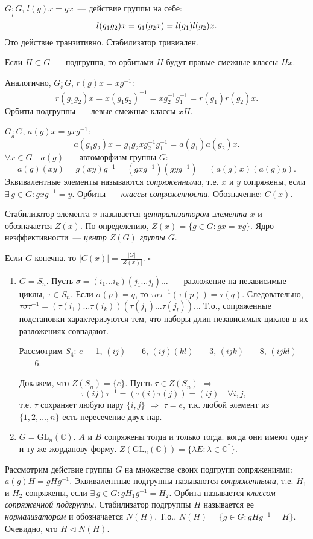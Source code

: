 \documentclass[a4paper]{article}
\newcommand*{\p}[1]{#1\nobreak\discretionary{}{\hbox{$\mathsurround=0pt #1$}}{}}
\begin{document}
$G\mathop{:}\limits_l G$, $l(g)x=gx$~--- действие группы на себе:
$$l(g_1g_2)x=g_1(g_2x)\p=l(g_1)l(g_2)x.$$ Это действие транзитивно.
Стабилизатор тривиален.

Если $H\subset G$~--- подгруппа, то орбитами $H$ будут правые
смежные классы $Hx$.

Аналогично, $G\mathop{:}\limits_r G$, $r(g)x=xg^{-1}$:
$$r(g_1g_2)x=x(g_1g_2)^{-1}=xg_2^{-1}g_1^{-1}=r(g_1)r(g_2)x.$$ Орбиты
подгруппы~--- левые смежные классы $xH$.

$G\mathop{:}\limits_a G$, $a(g)x=gxg^{-1}$:
$$a(g_1g_2)x=g_1g_2xg_2^{-1}g_1^{-1}=a(g_1)a(g_2)x.$$ $\forall x\in G
\quad a(g)$~--- автоморфизм группы $G$:
$$a(g)(xy)=g(xy)g^{-1}=(gxg^{-1})(gyg^{-1})=(a(g)x)(a(g)y).$$
Эквивалентные элементы называются \emph{сопряженными}, т.е. $x$ и
$y$ сопряжены, если $\exists \, g\in G: gxg^{-1}=y$. Орбиты~---
\emph{классы сопряженности}. Обозначение: $C(x)$.

Стабилизатор элемента $x$ называется \emph{централизатором элемента
$x$} и обозначается $Z(x)$. По определению, $Z(x)=\{g\in G:
gx=xg\}$. Ядро неэффективности~--- \emph{центр $Z(G)$ группы $G$}.

\begin{imp}
Если $G$ конечна. то $|C(x)|=\frac{|G|}{|Z(x)|}$. $\square$
\end{imp}

\begin{ex}
\begin{enumerate}
  \item $G=S_n$. Пусть $\sigma=(i_1\ldots
  i_k)(j_1\ldots j_l)\ldots$~--- разложение на независимые циклы, $\tau\in
  S_n$. Если $\sigma(p)=q$, то $\tau\sigma\tau^{-1}(\tau
  (p))=\tau(q)$. Следовательно, $\tau\sigma\tau^{-1}=(\tau(i_1)\ldots\tau(i_k))
  (\tau(j_1)\ldots\tau(j_l))\ldots$ Т.о., сопряженные подстановки
  характеризуются тем, что наборы длин независимых циклов в их
  разложениях совпадают.

  Рассмотрим $S_4$: $e$~---1, $(ij)$~--- 6, $(ij)(kl)$~--- 3,
  $(ijk)$~--- 8, $(ijkl)$~--- 6.

  Докажем, что $Z(S_n)=\{e\}$. Пусть $\tau\in Z(S_n)$ $\Rightarrow$
  $$\tau(ij)\tau^{-1}=(\tau(i)\tau(j))=(ij)\quad \forall i,j,$$ т.е.
  $\tau$ сохраняет любую пару $\{i,j\}$ $\Rightarrow$ $\tau=e$, т.к.
  любой элемент из $\{1,2,\ldots,n\}$ есть пересечение двух пар.
  \item $G=\mathrm{GL}_n(\mathbb{C})$. $A$ и $B$ сопряжены тогда и только
  тогда. когда они имеют одну и ту же жорданову форму. $Z(\mathrm{GL}_n(\mathbb{C}))=\{\lambda E:\lambda\in
  \mathbb{C}^*\}$.
\end{enumerate}
\end{ex}
Рассмотрим действие группы $G$ на множестве своих подгрупп
сопряжениями: $a(g)H=gHg^{-1}$. Эквивалентные подгруппы называются
\emph{сопряженными}, т.е. $H_1$ и $H_2$ сопряжены, если $\exists \,
g\in G: gH_1g^{-1}=H_2$. Орбита называется \emph{классом сопряженной
подгруппы}. Стабилизатор подгруппы $H$ называется ее
\emph{нормализатором} и обозначается $N(H)$. Т.о., $N(H)=\{g\in G:
gHg^{-1}=H\}$. Очевидно, что $H\triangleleft N(H)$.
\end{document}
